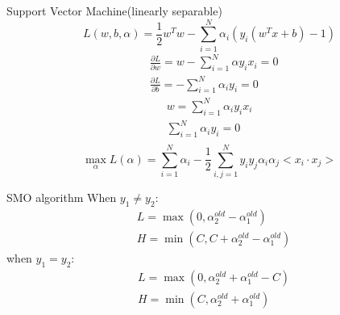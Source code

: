 \documentclass[10pt]{beamer}
\begin{document}
\begin{frame}{Support Vector Machine(linearly separable)}
\begin{equation}
L(w,b,\alpha) = \frac{1}{2}w^Tw-\sum_{i=1}^N\alpha_i(y_i(w^Tx+b)-1)
\end{equation}
\begin{equation}
    \begin{aligned}
&\frac{\partial{L}}{\partial{w}} = w - \sum_{i=1}^N\alpha y_ix_i = 0  \\
&\frac{\partial{L}}{\partial{b}} =- \sum_{i=1}^{N} \alpha_iy_i =0 
    \end{aligned} \label{Dif_wb}
\end{equation}
\begin{equation}
    \begin{aligned}
    w =\sum_{i=1}^N\alpha_i y_ix_i  \\
    \sum_{i=1}^{N} \alpha_iy_i = 0  \\ 
    \end{aligned}
    \label{wbValue}
\end{equation}
\begin{equation}
\underset{\alpha}{\max}L(\alpha)
=  \sum_{i=1}^N\alpha_i-\frac{1}{2}\sum_{i,j=1}^Ny_iy_j\alpha_i\alpha_j<x_i \cdot x_j>
    \label{o_wb}
\end{equation}
\end{frame}
\begin{frame}{SMO algorithm}
    When $y_1 \neq y_2$:
\begin{equation}
    \begin{aligned}
        & L = \max(0,\alpha_2^{old}-\alpha_1^{old}) \\
        & H = \min(C,C+\alpha_2^{old}-\alpha_1^{old})
    \end{aligned}
\end{equation}
when $y_1 = y_2$:
\begin{equation}
    \begin{aligned}
&    L = \max(0,\alpha_2^{old}+\alpha_1^{old}-C) \\
&    H = \min(C,\alpha_2^{old}+\alpha_1^{old})
    \end{aligned}
\end{equation}
\end{frame}
\end{document}
